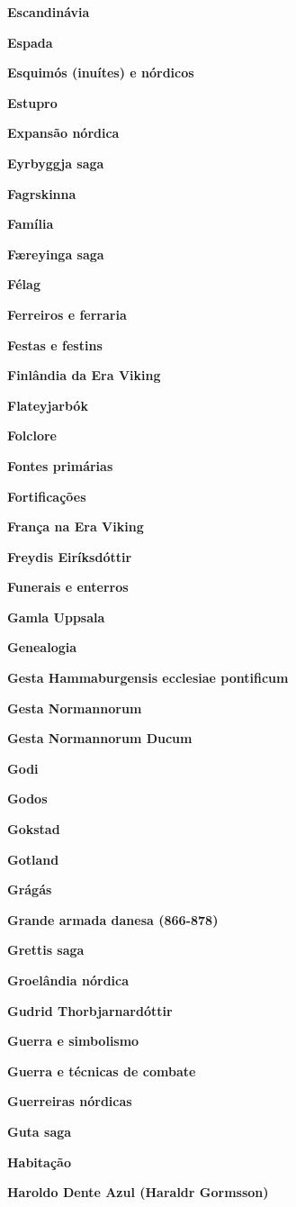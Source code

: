 \textbf{Escandinávia}

\textbf{Espada}

\textbf{Esquimós (inuítes) e nórdicos}

\textbf{Estupro}

\textbf{Expansão nórdica}

\textbf{Eyrbyggja saga}

\textbf{Fagrskinna}

\textbf{Família}

\textbf{Færeyinga saga}

\textbf{Félag}

\textbf{Ferreiros e ferraria}

\textbf{Festas e festins}

\textbf{Finlândia da Era Viking}

\textbf{Flateyjarbók}

\textbf{Folclore}

\textbf{Fontes primárias}

\textbf{Fortificações}

\textbf{França na Era Viking}

\textbf{Freydis Eiríksdóttir}

\textbf{Funerais e enterros}

\textbf{Gamla Uppsala}

\textbf{Genealogia}

\textbf{Gesta Hammaburgensis ecclesiae pontificum}

\textbf{Gesta Normannorum}

\textbf{Gesta Normannorum Ducum}

\textbf{Godi}

\textbf{Godos}

\textbf{Gokstad}

\textbf{Gotland}

\textbf{Grágás}

\textbf{Grande armada danesa (866-878)}

\textbf{Grettis saga}

\textbf{Groelândia nórdica}

\textbf{Gudrid Thorbjarnardóttir}

\textbf{Guerra e simbolismo}

\textbf{Guerra e técnicas de combate}

\textbf{Guerreiras nórdicas}

\textbf{Guta saga}

\textbf{Habitação}

\textbf{Haroldo Dente Azul (Haraldr Gormsson)}

